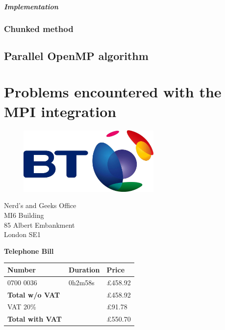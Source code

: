 \documentclass[11pt,a4paper]{article}
\begin{document}
\subparagraph{Implementation}

\subsubsection{Chunked method}

\subsection{Parallel OpenMP algorithm}

\newpage

\appendix
\section*{Problems encountered with the MPI integration}

\newpage

\begin{figure}[!h]
\includegraphics[width=7cm]{bt.jpg}
\end{figure}

\raggedleft
Nerd's and Geeks Office\\
MI6 Building\\
85 Albert Embankment\\
London SE1\\

\raggedright
\vspace{1cm}
\Huge{\textbf{Telephone Bill}}

\vspace{1cm}

\normalsize

\begin{tabularx}{\textwidth}{X X X}
  Number & Duration & Price \\
  \hline
  0700 0036 & 0h2m58s & \pounds458.92 \\
  \hline
  \textbf{Total w/o VAT} &  & \pounds458.92 \\
  \hline
  VAT 20\% & & \pounds91.78 \\
  \hline
  \textbf{Total with VAT} & & \pounds550.70 \\
\end{tabularx}
\end{document}

